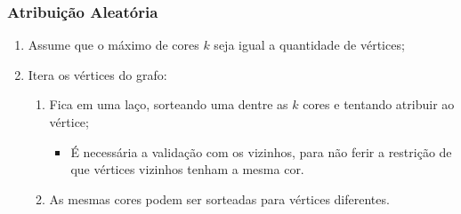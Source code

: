\documentclass[compress, hide notes]{beamer}
\let\olditem=\item%
\renewcommand{\item}{\olditem \justifying}%
\begin{document}
 
 
 \begin{frame}
 \frametitle{Atribuição Aleatória}
 
 \begin{enumerate}
 \item Assume que o máximo de cores $k$ seja igual a quantidade de vértices;
 
 \bigskip
 
 \item Itera os vértices do grafo:
 \begin{enumerate}
 \item Fica em uma laço, sorteando uma dentre as $k$ cores e tentando atribuir ao vértice;
 \begin{itemize}
 \item É necessária a validação com os vizinhos, para não ferir a restrição de que vértices vizinhos tenham a mesma cor.
 
 \bigskip
 
 \end{itemize}
 \item As mesmas cores podem ser sorteadas para vértices diferentes.
 \end{enumerate}
 \end{enumerate}
 
 \end{frame}
 
 
 
\end{document}
